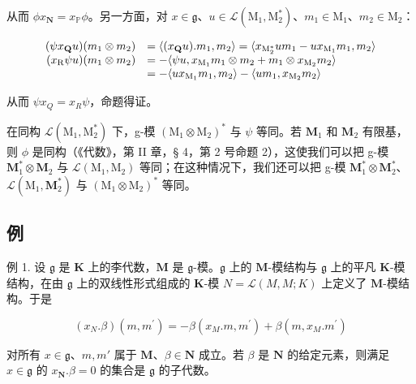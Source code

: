 从而 \(\phi x_{\mathbf{N}} = x_{\mathbb{P}}\phi\)。另一方面，对 \(x \in \mathfrak{g}\)、\(u \in \mathcal{L}(\mathrm{M}_1, \mathrm{M}_2^*)\)、\(m_1 \in \mathrm{M}_1\)、\(m_2 \in \mathrm{M}_2\)：

\[
\begin{array}{r l} (\psi x _ {\mathbf {Q}} u) (m _ {1} \otimes m _ {2}) & = \langle (x _ {\mathbf {Q}} u). m _ {1}, m _ {2} \rangle = \langle x _ {\mathrm{M} _ {2} ^ {*}} u m _ {1} - u x _ {\mathrm{M} _ {1}} m _ {1}, m _ {2} \rangle \\ (x _ {\mathrm{R}} \psi u) (m _ {1} \otimes m _ {2}) & = - \langle \psi u, x _ {\mathrm{M} _ {1}} m _ {1} \otimes m _ {2} + m _ {1} \otimes x _ {\mathrm{M} _ {2}} m _ {2} \rangle \\ & = - \langle u x _ {\mathrm{M} _ {1}} m _ {1}, m _ {2} \rangle - \langle u m _ {1}, x _ {\mathrm{M} _ {2}} m _ {2} \rangle \end{array}
\]

从而 \(\psi x_{Q} = x_{R}\psi\)，命题得证。

在同构 \(\mathcal{L}(\mathrm{M}_1,\mathrm{M}_2^*)\) 下，g-模 \((\mathrm{M}_1\otimes \mathrm{M}_2)^*\) 与 \(\psi\) 等同。若 \(\mathbf{M}_1\) 和 \(\mathbf{M}_2\) 有限基，则 \(\phi\) 是同构（《代数》，第 II 章，§ 4，第 2 号命题 2），这使我们可以把 g-模 \(\mathbf{M}_1^*\otimes \mathbf{M}_2\) 与 \(\mathcal{L}(\mathrm{M}_1,\mathrm{M}_2)\) 等同；在这种情况下，我们还可以把 g-模 \(\mathbf{M}_1^*\otimes \mathbf{M}_2^*\)、\(\mathcal{L}(\mathrm{M}_1,\mathbf{M}_2^*)\) 与 \((\mathrm{M}_1\otimes \mathrm{M}_2)^*\) 等同。

\subsection{例}

例 1. 设 \(\mathfrak{g}\) 是 \(\mathbf{K}\) 上的李代数，\(\mathbf{M}\) 是 \(\mathfrak{g}\)-模。\(\mathfrak{g}\) 上的 \(\mathbf{M}\)-模结构与 \(\mathfrak{g}\) 上的平凡 \(\mathbf{K}\)-模结构，在由 \(\mathfrak{g}\) 上的双线性形式组成的 \(\mathbf{K}\)-模 \(N = \mathcal{L}(M, M; K)\) 上定义了 \(\mathbf{M}\)-模结构。于是

\[
(x _ {N}. \beta) (m, m ^ {\prime}) = - \beta (x _ {M}. m, m ^ {\prime}) + \beta (m, x _ {M}. m ^ {\prime})\tag{10}
\]

对所有 \(x \in \mathfrak{g}\)、\(m, m'\) 属于 \(\mathbf{M}\)、\(\beta \in \mathbf{N}\) 成立。若 \(\beta\) 是 \(\mathbf{N}\) 的给定元素，则满足 \(x \in \mathfrak{g}\) 的 \(x_{\mathbf{N}}. \beta = 0\) 的集合是 \(\mathfrak{g}\) 的子代数。

